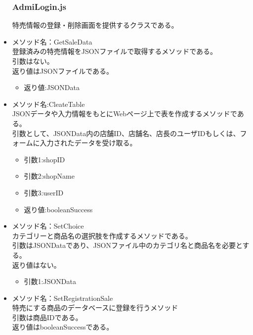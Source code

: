 \documentclass[a4j]{jarticle}
\begin{document}
\begin{itemize}
\subsubsection{AdmiLogin.js}

特売情報の登録・削除画面を提供するクラスである。
\item メソッド名：GetSaleData\\

登録済みの特売情報をJSONファイルで取得するメソッドである。\\
引数はない。\\
返り値はJSONファイルである。
	\begin{itemize}	
		\item 返り値:JSONData
	\end{itemize}


\item メソッド名:CleateTable\\
JSONデータや入力情報をもとにWebページ上で表を作成するメソッドである。\\
引数として、JSONData内の店舗ID、店舗名、店長のユーザIDもしくは、フォームに入力されたデータを受け取る。
	\begin{itemize}	
		\item 引数1:shopID
		\item 引数2:shopName
		\item 引数3:userID
		\item 返り値:booleanSuccess
	\end{itemize}
\item メソッド名：SetChoice\\

カテゴリーと商品名の選択肢を作成するメソッドである。\\
引数はJSONDataであり、JSONファイル中のカテゴリ名と商品名を必要とする。\\
返り値はない。
	\begin{itemize}
		\item 引数1:JSONData
	\end{itemize}
	
\item メソッド名：SetRegistrationSale\\

特売にする商品のデータベースに登録を行うメソッド\\
引数は商品IDである。\\%
返り値はbooleanSuccessである。


\end{itemize}
\end{document}
